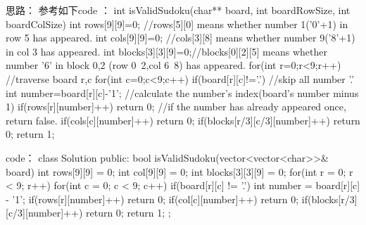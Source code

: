 思路：
参考如下code ：
int isValidSudoku(char** board, int boardRowSize, int boardColSize) {
    int rows[9][9]={0}; //rows[5][0] means whether number 1('0'+1) in row 5 has appeared.
	int cols[9][9]={0}; //cols[3][8] means whether number 9('8'+1) in col 3 has appeared.
	int blocks[3][3][9]={0};//blocks[0][2][5] means whether number '6' in block 0,2 (row 0~2,col 6~8) has appeared.
	for(int r=0;r<9;r++)    //traverse board r,c
		for(int c=0;c<9;c++)
			if(board[r][c]!='.'){   //skip all number '.'
				int number=board[r][c]-'1'; //calculate the number's index(board's number minus 1)
				if(rows[r][number]++) return 0; //if the number has already appeared once, return false.
				if(cols[c][number]++) return 0;
				if(blocks[r/3][c/3][number]++) return 0;
			}
	return 1;
}


























code：
class Solution {
public:
    bool isValidSudoku(vector<vector<char>>& board) {
        int rows[9][9] = {0};
        int col[9][9] = {0};
        int blocks[3][3][9] = {0};
        for(int r = 0; r < 9; r++)
            for(int c = 0; c < 9; c++)
            {
                if(board[r][c] != '.')
                {
                    int number = board[r][c] - '1';
                    if(rows[r][number]++) return 0;
                    if(col[c][number]++) return 0;
                    if(blocks[r/3][c/3][number]++) return 0;
                }
            }
        return 1;
    }
};